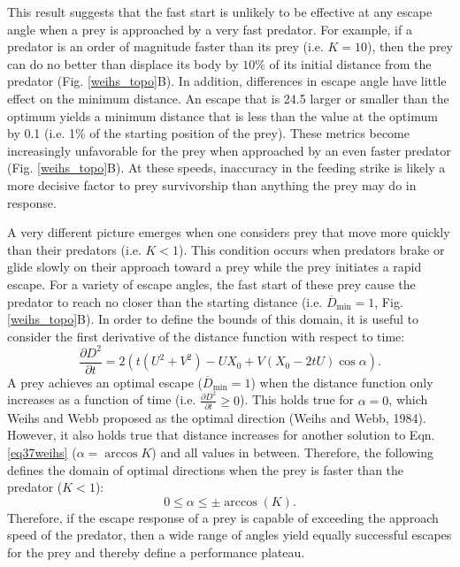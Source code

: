 \documentclass[12pt]{article}
\def\d{\partial}
\newcommand{\ol}{\overline}
\begin{document}
This result suggests that the fast start is unlikely to be effective at any escape angle when a prey is approached by a very fast predator. For example, if a predator is an order of magnitude faster than its prey (i.e. $K=10$), then the prey can do no better than displace its body by $10\%$ of its initial distance from the predator (Fig. \ref{weihs_topo}B). In addition, differences in escape angle have little effect on the minimum distance. An escape that is  24.5\textdegree\hspace{2pt} larger or smaller than the optimum yields a minimum distance that is less than the value at the optimum by 0.1 (i.e. 1\% of the starting position of the prey). These metrics become increasingly unfavorable for the prey when approached by an even faster predator (Fig. \ref{weihs_topo}B). At these speeds, inaccuracy in the feeding strike is likely a more decisive factor to prey survivorship than anything the prey may do in response.

A very different picture emerges when one considers prey that move more quickly than their predators (i.e. $K<1$). This condition occurs when predators brake or glide slowly on their approach toward a prey \citep{Higham:2007go, Higham:2005iu} while the prey initiates a rapid escape. For a variety of escape angles, the fast start of these prey cause the predator to reach no closer than the starting distance (i.e. $\ol D_{\text{min}}=1$, Fig. \ref{weihs_topo}B). In order to define the bounds of this domain, it is useful to consider the first derivative of the distance function with respect to time:
%
\begin{equation}
\frac{\d D^2}{\d t}= 2(t(U^2+V^2) - UX_0 + V(X_0-2tU)\cos\alpha).
\label{distderivative}
\end{equation}  
%
A prey achieves an optimal escape ($\ol D_{\text{min}}=1$) when the distance function only increases as a function of time (i.e. $\frac{\d D^2}{\d t}\geq0$). This holds true for $\alpha=0$, which Weihs and Webb proposed as the optimal direction (Weihs and Webb, 1984). However, it also holds true that distance increases for another solution to Eqn. \ref{eq37weihs} ($\alpha=\arccos K$) and all values in between. Therefore, the following defines the domain of optimal directions when the prey is faster than the predator ($K<1$):
%
\begin{equation}
0 \leq \alpha \leq \pm \arccos(K).
\label{anglerange}
\end{equation}
%
Therefore, if the escape response of a prey is capable of exceeding the approach speed of the predator, then a wide range of angles yield equally successful escapes for the prey and thereby define a performance plateau. 
\end{document}
